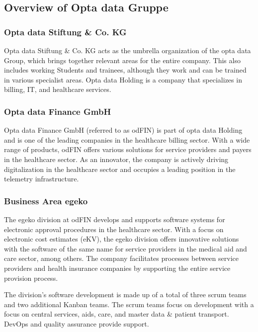 \subsection{Overview of Opta data Gruppe}
\subsubsection{Opta data Stiftung \& Co. KG }
Opta data Stiftung \& Co. KG acts as the umbrella organization of the opta data Group, which brings together relevant areas for the entire company. This also includes working Students and trainees, although they work and can be trained in various specialist areas. Opta data Holding is a company that specializes in billing, IT, and healthcare services.

\subsubsection{Opta data Finance GmbH  }
Opta data Finance GmbH (referred to as odFIN) is part of opta data Holding and is one of the leading companies in the healthcare billing sector. With a wide range of products, odFIN offers various solutions for service providers and payers in the healthcare sector. As an innovator, the company is actively driving digitalization in the healthcare sector and occupies a leading position in the telemetry infrastructure.

\subsubsection{Business Area egeko }
The egeko division at odFIN develops and supports software systems for electronic approval procedures in the healthcare sector. With a focus on electronic cost estimates (eKV), the egeko division offers innovative solutions with the software of the same name for service providers in the medical aid and care sector, among others. The company facilitates processes between service providers and health insurance companies by supporting the entire service provision process.\vspace{.4cm}

The division's software development is made up of a total of three scrum teams and two additional Kanban teams. The scrum teams focus on development with a focus on central services, aids, care, and master data \& patient transport. DevOps and quality assurance provide support.\vspace{.4cm} 

